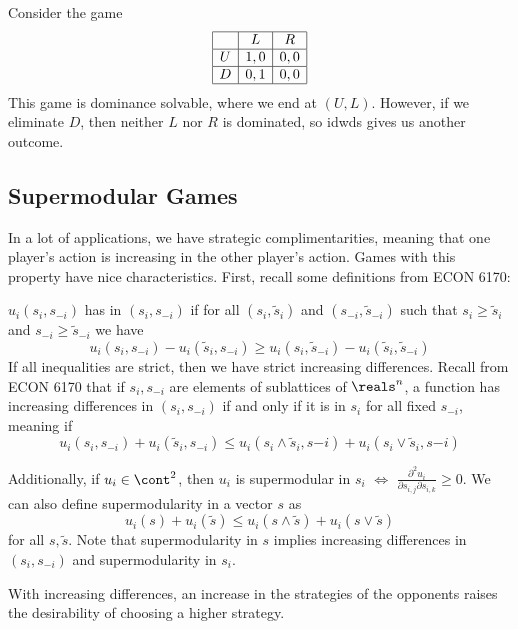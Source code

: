 \documentclass[10pt]{article}
\begin{document}
\begin{example}
	Consider the game
	\[
	\begin{array}{|c|c|c|}
		\hline & L & R \\\hline
		U & 1,0 & 0,0 \\\hline
		D & 0,1 & 0,0 \\\hline
	\end{array}
	\]
	This game is dominance solvable, where we end at $(U,L)$. However, if we eliminate  $D$, then neither $L$ nor $R$ is dominated, so idwds gives us another outcome.
\end{example}

\subsection{Supermodular Games}

\begin{remark}
	In a lot of applications, we have strategic complimentarities, meaning that one player's action is increasing in the other player's action. Games with this property have nice characteristics. First, recall some definitions from ECON 6170:
\end{remark}
	\begin{definition}
		$u_i(s_i,s_{-i})$ has  in $(s_i,s_{-i})$ if for all $(s_i,\tilde{s}_i)$ and $(s_{-i},\tilde{s}_{-i})$ such that $s_i \ge \tilde{s}_i$ and $s_{-i} \ge \tilde{s}_{-i}$ we have \[u_i(s_i,s_{-i}) - u_i(\tilde{s}_i,s_{-i}) \ge u_i(s_i,\tilde{s}_{-i}) - u_i(\tilde{s}_i,\tilde{s}_{-i})\]If all inequalities are strict, then we have strict increasing differences. Recall from ECON 6170 that if $s_i,s_{-i}$ are elements of sublattices of $\reals^n$, a function has increasing differences in $(s_i,s_{-i})$ if and only if it is  in $s_i$ for all fixed $s_{-i}$, meaning if \[u_i(s_i,s_{-i}) + u_i(\tilde{s}_i,s_{-i}) \le u_i(s_i \wedge \tilde{s}_i,s{-i}) + u_i(s_i \vee \tilde{s}_i,s{-i})\]
		
		Additionally, if $u_i \in \cont^2$, then $u_i$ is supermodular in $s_i$ $\Longleftrightarrow$ $\frac{\partial^2 u_i}{\partial s_{i,j} \partial s_{i,k}} \ge 0$. We can also define supermodularity in a vector $s$ as \[u_i(s) + u_i(\tilde{s}) \le u_i(s \wedge \tilde{s}) + u_i(s \vee \tilde{s})\]for all $s,\tilde{s}$. Note that supermodularity in $s$ implies increasing differences in $(s_i,s_{-i})$ and supermodularity in $s_i$.
	\end{definition}
\begin{remark}
	With increasing differences, an increase in the strategies of the opponents raises the desirability of choosing a higher strategy.
\end{remark}
\end{document}
